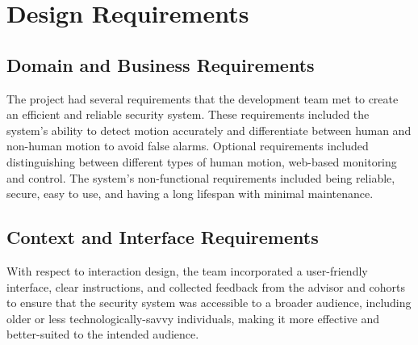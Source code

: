 \section{Design Requirements}\label{sec:project-requirements}

\subsection{Domain and Business Requirements}\label{subsec:domain-and-business-requirements}
The \brand{} project had several requirements that the development team met to
create an efficient and reliable security system. %
These requirements included the system's ability to detect motion accurately and differentiate between human and
non-human motion to avoid false alarms. %
Optional requirements included distinguishing between different types of human motion, web-based monitoring and control. %
The system's non-functional requirements included being reliable, secure,
easy to use, and having a long lifespan with minimal maintenance. %

\subsection{Context and Interface Requirements}\label{subsec:context-and-interface-requirements}

With respect to interaction design, the team incorporated a user-friendly interface, clear
instructions, and collected feedback from the advisor and cohorts to ensure that the
security system was accessible to a broader audience, including older or less
technologically-savvy individuals, making it more effective and better-suited to the
intended audience. %




